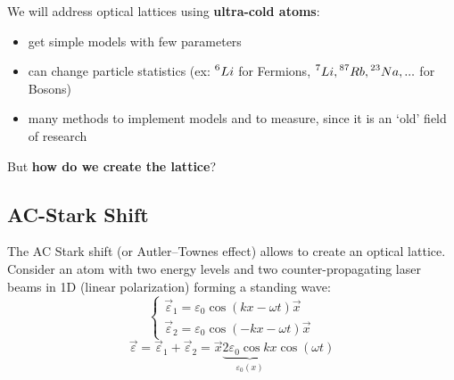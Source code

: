 
\noindent We will address optical lattices using \textbf{ultra-cold atoms}:
\begin{itemize}
    \item get simple models with few parameters
    \item can change particle statistics (ex: $\prescript{6}{}{Li}$ for Fermions, $\prescript{7}{}{Li}, \prescript{87}{}{Rb}, \prescript{23}{}{Na}, ...$ for Bosons)
    \item many methods to implement models and to measure, since it is an `old' field of research
\end{itemize}


\noindent But \textbf{how do we create the lattice}?




\subsection{AC-Stark Shift}

\begin{center}
    
\end{center}

The AC Stark shift (or Autler–Townes effect) allows to create an optical lattice. Consider an atom with two energy levels and two counter-propagating laser beams in 1D (linear polarization) forming a standing wave:
\begin{equation*}
\begin{cases}
    \vec{\varepsilon}_1 = \varepsilon_0\cos(kx-\omega t)\vec{x}\\
    \vec{\varepsilon}_2 = \varepsilon_0\cos(-kx-\omega t)\vec{x}
\end{cases}
\end{equation*}
\begin{equation*}
\vec{\varepsilon}
= \vec{\varepsilon}_1 + \vec{\varepsilon}_2
= \vec{x} \underbrace{2\varepsilon_0\cos kx}_{\varepsilon_0(x)} \cos(\omega t) 
\end{equation*}

